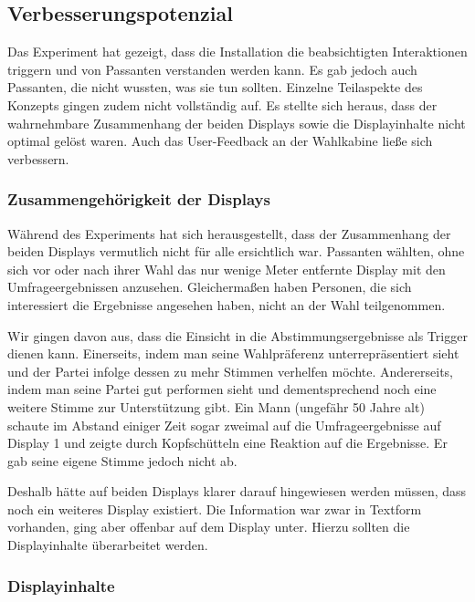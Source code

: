\subsection{Verbesserungspotenzial}\label{verbesserungspotenzial}

Das Experiment hat gezeigt, dass die Installation die beabsichtigten Interaktionen triggern und von Passanten verstanden werden kann.
Es gab jedoch auch Passanten, die nicht wussten, was sie tun sollten.
Einzelne Teilaspekte des Konzepts gingen zudem nicht vollständig auf.
Es stellte sich heraus, dass der wahrnehmbare Zusammenhang der beiden Displays sowie die Displayinhalte nicht optimal gelöst waren.
Auch das User-Feedback an der Wahlkabine ließe sich verbessern.

\subsubsection{Zusammengehörigkeit der Displays}\label{zusammenhang-der-displays}

Während des Experiments hat sich herausgestellt, dass der Zusammenhang der beiden Displays vermutlich nicht für alle ersichtlich war.
Passanten wählten, ohne sich vor oder nach ihrer Wahl das nur wenige Meter entfernte Display mit den Umfrageergebnissen anzusehen.
Gleichermaßen haben Personen, die sich interessiert die Ergebnisse angesehen haben, nicht an der Wahl teilgenommen.

Wir gingen davon aus, dass die Einsicht in die Abstimmungsergebnisse als Trigger dienen kann.
Einerseits, indem man seine Wahlpräferenz unterrepräsentiert sieht und der Partei infolge dessen zu mehr Stimmen verhelfen möchte.
Andererseits, indem man seine Partei gut performen sieht und dementsprechend noch eine weitere Stimme zur Unterstützung gibt.
Ein Mann (ungefähr 50 Jahre alt) schaute im Abstand einiger Zeit sogar zweimal auf die Umfrageergebnisse auf Display 1 und zeigte durch Kopfschütteln eine Reaktion auf die Ergebnisse.
Er gab seine eigene Stimme jedoch nicht ab.

Deshalb hätte auf beiden Displays klarer darauf hingewiesen werden müssen, dass noch ein weiteres Display existiert.
Die Information war zwar in Textform vorhanden, ging aber offenbar auf dem Display unter.
Hierzu sollten die Displayinhalte überarbeitet werden.

\subsubsection{Displayinhalte}\label{displayinhalte}

